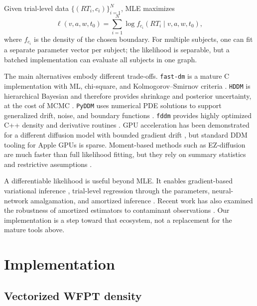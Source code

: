 \documentclass[11pt]{article}
\begin{document}
Given trial-level data $\{(RT_i,c_i)\}_{i=1}^N$, MLE maximizes
\begin{equation}
  \ell(v,a,w,t_0)
  =
  \sum_{i=1}^{N}
  \log f_{c_i}(RT_i\mid v,a,w,t_0),
  \label{eq:loglik}
\end{equation}
where $f_{c_i}$ is the density of the chosen boundary. For multiple subjects, one can fit a separate parameter vector per subject; the likelihood is separable, but a batched implementation can evaluate all subjects in one graph.

The main alternatives embody different trade-offs. \texttt{fast-dm} is a mature C implementation with ML, chi-square, and Kolmogorov--Smirnov criteria \citep{Voss2015}. \texttt{HDDM} is hierarchical Bayesian and therefore provides shrinkage and posterior uncertainty, at the cost of MCMC \citep{Wiecki2013}. \texttt{PyDDM} uses numerical PDE solutions to support generalized drift, noise, and boundary functions \citep{Shinn2020}. \texttt{fddm} provides highly optimized C++ density and derivative routines \citep{FosterSingmann2024}. GPU acceleration has been demonstrated for a different diffusion model with bounded gradient drift \citep{Loossens2022}, but standard DDM tooling for Apple GPUs is sparse. Moment-based methods such as EZ-diffusion are much faster than full likelihood fitting, but they rely on summary statistics and restrictive assumptions \citep{Wagenmakers2007}.

A differentiable likelihood is useful beyond MLE. It enables gradient-based variational inference \citep{Blei2017,Kucukelbir2017}, trial-level regression through the parameters, neural-network amalgamation, and amortized inference \citep{Wu2026}. Recent work has also examined the robustness of amortized estimators to contaminant observations \citep{WuRadev2024}. Our implementation is a step toward that ecosystem, not a replacement for the mature tools above.

\section{Implementation}

\subsection{Vectorized WFPT density}
\end{document}
